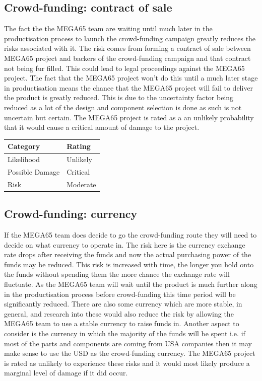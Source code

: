 \subsection{Crowd-funding: contract of sale}
The fact the the MEGA65 team are waiting until much later in the productisation process to launch the crowd-funding campaign greatly reduces the risks associated with it. The risk comes from forming a contract of sale between MEGA65 project and backers of the crowd-funding campaign and that contract not being fur filled. This could lead to legal proceedings against the MEGA65 project. The fact that the MEGA65 project won't do this until a much later stage in productisation means the chance that the MEGA65 project will fail to deliver the product is greatly reduced. This is due to the uncertainty factor being reduced as a lot of the design and component selection is done as such is not uncertain but certain. The MEGA65 project is rated as a an unlikely probability that it would cause a critical amount of damage to the project. \\

\begin{tabular}{l|l} %
    	\textbf{Category} 	&	\textbf{Rating} \\
      \hline
     Likelihood			&	Unlikely \\
     Possible Damage 	& 	Critical \\
     Risk 				&	Moderate		\\	
    \end{tabular}


\subsection{Crowd-funding: currency}
If the MEGA65 team does decide to go the crowd-funding route they will need to decide on what currency to operate in. The risk here is the currency exchange rate drops after receiving the funds and now the actual purchasing power of the funds may be reduced. This risk is increased with time, the longer you hold onto the funds without spending them the more chance the exchange rate will fluctuate. As the MEGA65 team will wait until the product is much further along in the productisation process before crowd-funding this time period will be significantly reduced. There are also some currency which are more stable, in general, and research into these would also reduce the risk by allowing the MEGA65 team to use a stable currency to raise funds in. Another aspect to consider is the currency in which the majority of the funds will be spent i.e. if most of the parts and components are coming from USA companies then it may make sense to use the USD as the crowd-funding currency. The MEGA65 project is rated as unlikely to experience these risks and it would most likely produce a marginal level of damage if it did occur. \\

